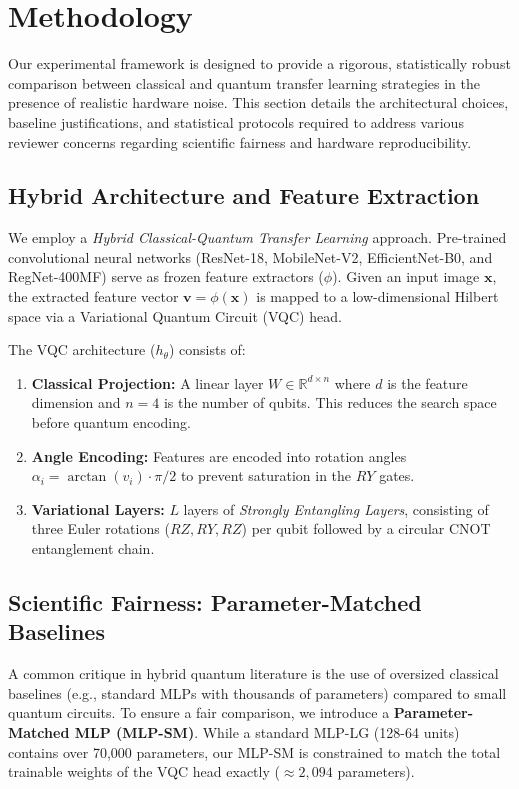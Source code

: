 
\section{Methodology}
\label{sec:methodology}

Our experimental framework is designed to provide a rigorous, statistically robust comparison between classical and quantum transfer learning strategies in the presence of realistic hardware noise. This section details the architectural choices, baseline justifications, and statistical protocols required to address various reviewer concerns regarding scientific fairness and hardware reproducibility.

\subsection{Hybrid Architecture and Feature Extraction}
We employ a \textit{Hybrid Classical-Quantum Transfer Learning} approach. Pre-trained convolutional neural networks (ResNet-18, MobileNet-V2, EfficientNet-B0, and RegNet-400MF) serve as frozen feature extractors ($\phi$). Given an input image $\mathbf{x}$, the extracted feature vector $\mathbf{v} = \phi(\mathbf{x})$ is mapped to a low-dimensional Hilbert space via a Variational Quantum Circuit (VQC) head.

The VQC architecture ($h_\theta$) consists of:
\begin{enumerate}
    \item \textbf{Classical Projection:} A linear layer $W \in \mathbb{R}^{d \times n}$ where $d$ is the feature dimension and $n=4$ is the number of qubits. This reduces the search space before quantum encoding.
    \item \textbf{Angle Encoding:} Features are encoded into rotation angles $\alpha_i = \arctan(v_i) \cdot \pi/2$ to prevent saturation in the $RY$ gates.
    \item \textbf{Variational Layers:} $L$ layers of \textit{Strongly Entangling Layers}, consisting of three Euler rotations ($RZ, RY, RZ$) per qubit followed by a circular CNOT entanglement chain.
\end{enumerate}

\subsection{Scientific Fairness: Parameter-Matched Baselines}
A common critique in hybrid quantum literature is the use of oversized classical baselines (e.g., standard MLPs with thousands of parameters) compared to small quantum circuits. To ensure a fair comparison, we introduce a \textbf{Parameter-Matched MLP (MLP-SM)}. While a standard MLP-LG (128-64 units) contains over 70,000 parameters, our MLP-SM is constrained to match the total trainable weights of the VQC head exactly ($\approx 2,094$ parameters). 

